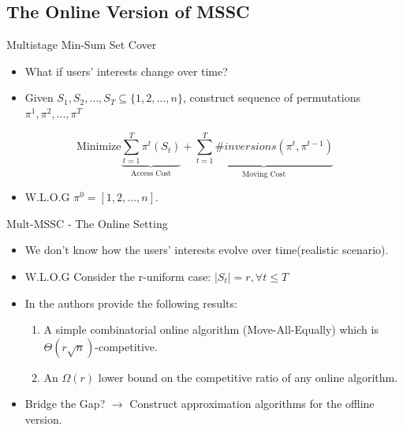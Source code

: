 \documentclass{beamer}
\def\DSSC{\mathrm{Mult}\text{-}\mathrm{MSSC}}
\begin{document}
\subsection{The Online Version of MSSC}

\begin{frame}{Multistage Min-Sum Set Cover}
    \begin{itemize}
         \item What if users' interests change over time?
         \item Given $S_1, S_2, \ldots, S_T \subseteq\{1,2,\ldots,n\}$, construct sequence of permutations $\pi^1, \pi^2, ..., \pi^T$
    \end{itemize}
    
     $$\text{Minimize} \underbrace{\sum_{t=1}^T \pi^t ( S_t )}_{\text{Access Cost}} + \underbrace{\sum_{t=1}^T \#inversions( \pi^t, \pi^{t-1} )}_{\text{Moving Cost}}$$
    
    \begin{itemize}
         \item W.L.O.G $\pi^0 = [ 1,2, \ldots, n ]$.
    \end{itemize}
\end{frame}

\begin{frame}{$\DSSC$ - The Online Setting}
    \begin{itemize}
         \item We don't know how the users' interests evolve over time(realistic scenario).
         \item W.L.O.G Consider the r-uniform case: $|S_t|=r, \forall t \leq T$
         \item In \cite{FKKSV20} the authors provide the following results:
            \begin{enumerate}
                 \item A simple combinatorial online algorithm (Move-All-Equally) which is $\Theta(r \sqrt n )$-competitive. \\
                
                 \item An $\Omega(r)$ lower bound on the competitive ratio of any online algorithm.
            \end{enumerate}
         \item Bridge the Gap? $\rightarrow$  Construct approximation algorithms for the offline version.
    \end{itemize}
\end{frame}
\end{document}
